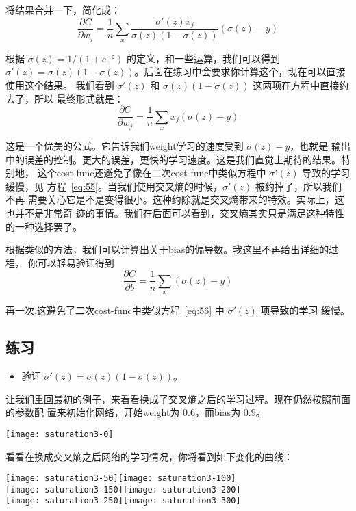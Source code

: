 将结果合并一下，简化成：
\begin{equation}
  \frac{\partial C}{\partial w_j} = \frac{1}{n} \sum_x \frac{\sigma'(z)
    x_j}{\sigma(z) (1-\sigma(z))} (\sigma(z)-y)
\label{eq:60}\tag{60}
\end{equation}

根据 $\sigma(z) = 1/(1+e^{-z})$ 的定义，和一些运算，我们可以得到 $\sigma'(z) =
\sigma(z)(1-\sigma(z))$。后面在练习中会要求你计算这个，现在可以直接使用这个结果。
我们看到 $\sigma'(z)$ 和 $\sigma(z)(1-\sigma(z))$ 这两项在方程中直接约去了，所以
最终形式就是：
\begin{equation}
  \frac{\partial C}{\partial w_j} =  \frac{1}{n} \sum_x x_j(\sigma(z)-y)
\label{eq:61}\tag{61}
\end{equation}

这是一个优美的公式。它告诉我们\gls*{weight}学习的速度受到 $\sigma(z)-y$，也就是
输出中的误差的控制。更大的误差，更快的学习速度。这是我们直觉上期待的结果。特别地，
这个\gls*{cost-func}还避免了像在二次\gls*{cost-func}中类似方程中 $\sigma'(z)$ 导致的学习缓慢，见
方程~\eqref{eq:55}。当我们使用交叉熵的时候，$\sigma'(z)$ 被约掉了，所以我们不再
需要关心它是不是变得很小。这种约除就是交叉熵带来的特效。实际上，这也并不是非常奇
迹的事情。我们在后面可以看到，交叉熵其实只是满足这种特性的一种选择罢了。

根据类似的方法，我们可以计算出关于\gls*{bias}的偏导数。我这里不再给出详细的过程，
你可以轻易验证得到
\begin{equation}
  \frac{\partial C}{\partial b} = \frac{1}{n} \sum_x (\sigma(z)-y)
\label{eq:62}\tag{62}
\end{equation}

再一次,这避免了二次\gls*{cost-func}中类似方程~\eqref{eq:56} 中 $\sigma'(z)$ 项导致的学习
缓慢。

\subsection*{练习}

\begin{itemize}
\item 验证 $\sigma'(z) = \sigma(z)(1-\sigma(z))$。
\end{itemize}

让我们重回最初的例子，来看看换成了交叉熵之后的学习过程。现在仍然按照前面的参数配
置来初始化网络，开始\gls*{weight}为 $0.6$，而\gls*{bias}为 $0.9$。
\begin{center}
  \texttt{[image: saturation3-0]}
\end{center}
看看在换成交叉熵之后网络的学习情况，你将看到如下变化的曲线：
\begin{center}
  \texttt{[image: saturation3-50]}\texttt{[image: saturation3-100]}\\
  \texttt{[image: saturation3-150]}\texttt{[image: saturation3-200]}\\
  \texttt{[image: saturation3-250]}\texttt{[image: saturation3-300]}
\end{center}

